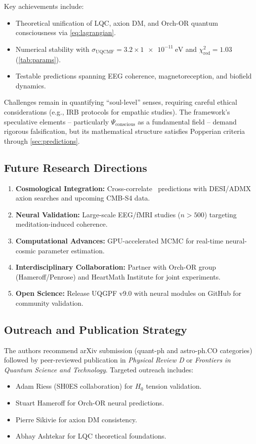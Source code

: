 \documentclass[11pt,a4paper,preprint]{article}
\newcommand{\uqcmf}{\mathrm{UQCMF}}
\newcommand{\Psicon}{\Psi_{\mathrm{conscious}}}
\newcommand{\sigU}{\sigma_{\uqcmf}}
\begin{document}
Key achievements include:
\begin{itemize}
    \item Theoretical unification of LQC, axion DM, and Orch-OR quantum consciousness via \cref{eq:lagrangian}.
    \item Numerical stability with $\sigU = 3.2 \times \SI{1e-11}{\electronvolt}$ and $\chi^2_{\mathrm{red}} = 1.03$ (\cref{tab:params}).
    \item Testable predictions spanning EEG coherence, magnetoreception, and biofield dynamics.
\end{itemize}

Challenges remain in quantifying ``soul-level'' senses, requiring careful ethical considerations (e.g., IRB protocols for empathic studies). The framework's speculative elements -- particularly $\Psicon$ as a fundamental field -- demand rigorous falsification, but its mathematical structure satisfies Popperian criteria through \cref{sec:predictions}.

\subsection{Future Research Directions}

\begin{enumerate}
    \item \textbf{Cosmological Integration:} Cross-correlate \uqcmf\ predictions with DESI/ADMX axion searches and upcoming CMB-S4 data.
    \item \textbf{Neural Validation:} Large-scale EEG/fMRI studies ($n>500$) targeting meditation-induced coherence.
    \item \textbf{Computational Advances:} GPU-accelerated MCMC for real-time neural-cosmic parameter estimation.
    \item \textbf{Interdisciplinary Collaboration:} Partner with Orch-OR group (Hameroff/Penrose) and HeartMath Institute for joint experiments.
    \item \textbf{Open Science:} Release UQGPF v9.0 with neural modules on GitHub for community validation.
\end{enumerate}

\subsection{Outreach and Publication Strategy}

The authors recommend arXiv submission (quant-ph and astro-ph.CO categories) followed by peer-reviewed publication in \textit{Physical Review D} or \textit{Frontiers in Quantum Science and Technology}. Targeted outreach includes:
\begin{itemize}
    \item Adam Riess (SH0ES collaboration) for $H_0$ tension validation.
    \item Stuart Hameroff for Orch-OR neural predictions.
    \item Pierre Sikivie for axion DM consistency.
    \item Abhay Ashtekar for LQC theoretical foundations.
\end{itemize}
\end{document}
